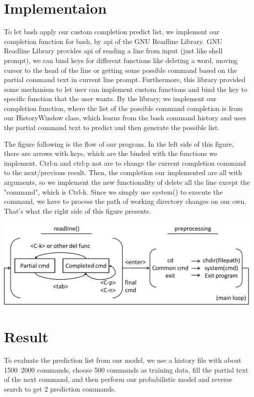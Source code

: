 \documentclass[11pt,a4paper]{article}
\begin{document}
\section*{Implementaion}
To let bash apply our custom completion predict list, 
we implement our completion function for bash, by api of the GNU Readline Library. 
GNU Readline Library provides api of reading a line from input (just like shell prompt), 
we can bind keys for different functions like deleting a word, 
moving cursor to the head of the line or getting some possible command 
based on the partial command text in current line prompt. 
Furthermore, this library provided some mechanism to let user can implement custom functions 
and bind the key to specific function that the user wants. 
By the library, we implement our completion function, 
where the list of the possible command completion is from our HistoryWindow class, 
which learns from the bash command history and uses the partial command text 
to predict and then generate the possible list.
\par
The figure following is the flow of our program.
In the left side of this figure, there are arrows with keys, 
which are the binded with the functions we implement. 
Ctrl-n and ctrl-p not are to change the current completion command to the next/previous result.
Then, the completion our implemented are all with arguments, so we implement the new functionality of delete
all the line except the "command", which is Ctrl-k.
Since we simply use system() to execute the command, 
we have to process the path of working directory changes on our own.
That's what the right side of this figure presents.
\\
\begin{center}
\includegraphics[scale=0.6]{pic.png}
\end{center}
\section*{Result}
To evaluate the prediction list from our model, we use a history file with about 1500~2000 commands, 
choose 500 commands as training data, fill the partial text of the next command,
and then perform our probabilistic model and reverse search to get 2 prediction commands.
\end{document}
